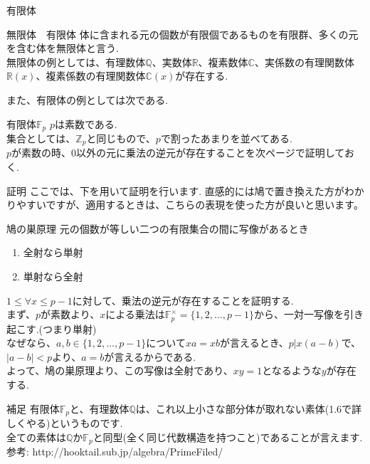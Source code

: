 \documentclass[dvipdfmx,11pt,notheorems]{beamer}
\begin{document}
\begin{frame}{有限体}
  \begin{block}{無限体　有限体}
    体に含まれる元の個数が有限個であるものを\alert{有限群}、多くの元を含む体を\alert{無限体}と言う. \\
    無限体の例としては、有理数体$\mathbb{Q}$、実数体$\mathbb{R}$、複素数体$\mathbb{C}$、実係数の有理関数体$\mathbb{R}(x)$、複素係数の有理関数体$\mathbb{C}(x)$が存在する.
  \end{block}
  また、有限体の例としては次である.
  \begin{exampleblock}{有限体$\mathbb{F}_p$}
    $p$は素数である.\\
    集合としては、$\mathbb{Z}_p$と同じもので、$p$で割ったあまりを並べてある.\\
    $p$が素数の時、$0$以外の元に乗法の逆元が存在することを次ページで証明しておく.
  \end{exampleblock}
\end{frame}

\begin{frame}{証明}
  ここでは、下を用いて証明を行います. 直感的には鳩で置き換えた方がわかりやすいですが、適用するときは、こちらの表現を使った方が良いと思います。
  \begin{alertblock}{鳩の巣原理}
    元の個数が等しい二つの有限集合の間に写像があるとき
    \begin{enumerate}
      \item 全射なら単射
      \item 単射なら全射
    \end{enumerate}
  \end{alertblock}
  $1 \le \forall x \le p-1$に対して、乗法の逆元が存在することを証明する.\\
  まず、$p$が素数より、$x$による乗法は$\mathbb{F}_p^\times = \{1,2,\ldots,p-1\}$から、一対一写像を引き起こす.(つまり単射)\\
  なぜなら、$a,b\in \{1,2,\ldots,p-1\}$について$xa=xb$が言えるとき、$p|x(a-b)$で、$|a-b|<p$より、$a=b$が言えるからである.\\

  よって、鳩の巣原理より、この写像は全射であり、$xy=1$となるような$y$が存在する.
\end{frame}
\begin{frame}{補足}
  有限体$\mathbb{F}_p$と、有理数体$\mathbb{Q}$は、これ以上小さな部分体が取れない\alert{素体}(1.6で詳しくやる)というものです.\\
  全ての素体は$\mathbb{Q}$か$\mathbb{F}_p$と同型(全く同じ代数構造を持つこと)であることが言えます.\\
  参考: http://hooktail.sub.jp/algebra/PrimeFiled/
\end{frame}
\end{document}
